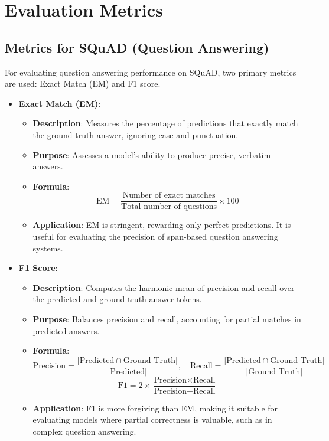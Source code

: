 \section{Evaluation Metrics}

\subsection{Metrics for SQuAD (Question Answering)}
For evaluating question answering performance on SQuAD, two primary metrics are used: Exact Match (EM) and F1 score.

\begin{itemize}
    \item \textbf{Exact Match (EM)}:
    \begin{itemize}
        \item \textbf{Description}: Measures the percentage of predictions that exactly match the ground truth answer, ignoring case and punctuation.
        \item \textbf{Purpose}: Assesses a model's ability to produce precise, verbatim answers.
        \item \textbf{Formula}: 
        \[
        \text{EM} = \frac{\text{Number of exact matches}}{\text{Total number of questions}} \times 100
        \]
        \item \textbf{Application}: EM is stringent, rewarding only perfect predictions. It is useful for evaluating the precision of span-based question answering systems.
    \end{itemize}
    \item \textbf{F1 Score}:
    \begin{itemize}
        \item \textbf{Description}: Computes the harmonic mean of precision and recall over the predicted and ground truth answer tokens.
        \item \textbf{Purpose}: Balances precision and recall, accounting for partial matches in predicted answers.
        \item \textbf{Formula}:
        \[
        \text{Precision} = \frac{|\text{Predicted} \cap \text{Ground Truth}|}{|\text{Predicted}|}, \quad \text{Recall} = \frac{|\text{Predicted} \cap \text{Ground Truth}|}{|\text{Ground Truth}|}
        \]
        \[
        \text{F1} = 2 \times \frac{\text{Precision} \times \text{Recall}}{\text{Precision} + \text{Recall}}
        \]
        \item \textbf{Application}: F1 is more forgiving than EM, making it suitable for evaluating models where partial correctness is valuable, such as in complex question answering.
    \end{itemize}
\end{itemize}

